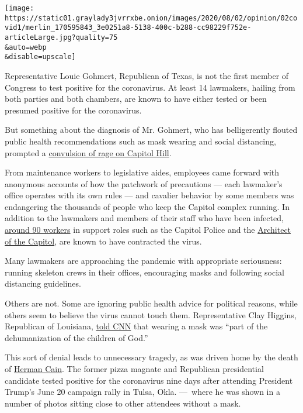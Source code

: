 \texttt{[image: https://static01.graylady3jvrrxbe.onion/images/2020/08/02/opinion/02covid1/merlin\_170595843\_3e0251a8-5138-400c-b288-cc98229f752e-articleLarge.jpg?quality=75\\\&auto=webp\\\&disable=upscale]}

Representative Louie Gohmert, Republican of Texas, is not the first
member of Congress to test positive for the coronavirus. At least 14
lawmakers, hailing from both parties and both chambers, are known to
have either tested or been presumed positive for the coronavirus.

But something about the diagnosis of Mr. Gohmert, who has belligerently
flouted public health recommendations such as mask wearing and social
distancing, prompted a
\href{https://www.politico.com/news/2020/07/30/capitol-hill-angry-gohmert-coronavirus-388230}{convulsion
of rage on Capitol Hill}.

From maintenance workers to legislative aides, employees came forward
with anonymous accounts of how the patchwork of precautions --- each
lawmaker's office operates with its own rules --- and cavalier behavior
by some members was endangering the thousands of people who keep the
Capitol complex running. In addition to the lawmakers and members of
their staff who have been infected,
\href{https://www.politico.com/news/2020/07/30/capitol-hill-angry-gohmert-coronavirus-388230}{around
90 workers} in support roles such as the Capitol Police and the
\href{https://www.aoc.gov/about-us/who-we-are}{Architect of the
Capitol}, are known to have contracted the virus.

Many lawmakers are approaching the pandemic with appropriate
seriousness: running skeleton crews in their offices, encouraging masks
and following social distancing guidelines.

Others are not. Some are ignoring public health advice for political
reasons, while others seem to believe the virus cannot touch them.
Representative Clay Higgins, Republican of Louisiana,
\href{https://www.cnn.com/2020/07/29/politics/pelosi-mask-mandate-capitol/index.html}{told
CNN} that wearing a mask was ``part of the dehumanization of the
children of God.''

This sort of denial leads to unnecessary tragedy, as was driven home by
the death of
\href{https://www.nytimes3xbfgragh.onion/2020/07/30/us/politics/herman-cain-dead.html}{Herman
Cain}. The former pizza magnate and Republican presidential candidate
tested positive for the coronavirus nine days after attending President
Trump's June 20 campaign rally in Tulsa, Okla. ---~where he was shown in
a number of photos sitting close to other attendees without a mask.

